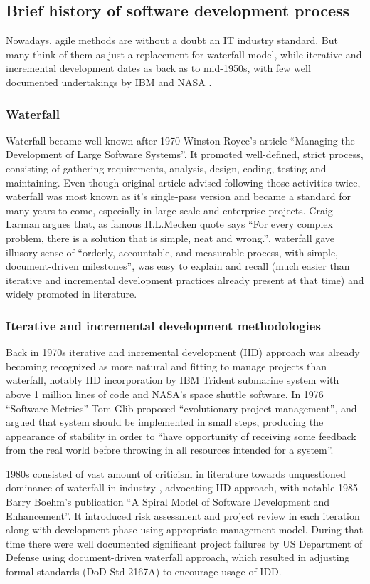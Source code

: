 \documentclass{article}
\begin{document}
\subsection{Brief history of software development process}
Nowadays, agile methods are without a doubt an IT industry standard. But many think of them as just a replacement for waterfall model, while iterative and incremental development dates as back as to mid-1950s, with few well documented undertakings by IBM and NASA \cite{larman2003iterative}.

\subsubsection{Waterfall}
Waterfall became well-known after 1970 Winston Royce's article ``Managing the Development of Large Software Systems''. It promoted well-defined, strict process, consisting of gathering requirements, analysis, design, coding, testing and maintaining. Even though original article advised following those activities twice, waterfall was most known as it's single-pass version and became a standard for many years to come, especially in large-scale and enterprise projects. Craig Larman \cite{larman2003iterative} argues that, as famous H.L.Mecken quote says ``For every complex problem, there is a solution that is simple, neat and wrong.'', waterfall gave illusory sense of ``orderly, accountable, and measurable process, with simple, document-driven milestones'', was easy to explain and recall (much easier than iterative and incremental development practices already present at that time) and widely promoted in literature.

\subsubsection{Iterative and incremental development methodologies}
Back in 1970s iterative and incremental development (IID) approach was already becoming recognized as more natural and fitting to manage projects than waterfall, notably IID incorporation by IBM Trident submarine system with above 1 million lines of code and NASA's space shuttle software. In 1976 ``Software Metrics'' Tom Glib proposed ``evolutionary project management'', and argued that system should be implemented in small steps, producing the appearance of stability in order to ``have opportunity of receiving some feedback from the real world before throwing in all resources intended for a system''.

1980s consisted of vast amount of criticism in literature towards unquestioned dominance of waterfall in industry \cite{larman2003iterative}, advocating IID approach, with notable 1985 Barry Boehm's publication ``A Spiral Model of Software Development and Enhancement''. It introduced risk assessment and project review in each iteration along with development phase using appropriate management model. During that time there were well documented significant project failures by US Department of Defense using document-driven waterfall approach, which resulted in adjusting formal standards (DoD-Std-2167A) to encourage usage of IDD.
\end{document}

